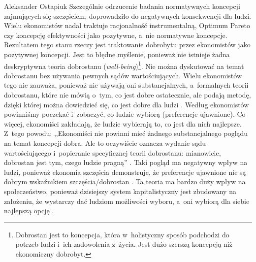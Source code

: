 \begin{artplenv}{Aleksander Ostapiuk}
Szczególnie odrzucenie badania normatywnych koncepcji zajmujących się szczęściem, doprowadziło do negatywnych
konsekwencji dla ludzi. Wielu ekonomistów nadal traktuje racjonalność instrumentalną, Optimum Pareto czy koncepcję
efektywności jako pozytywne, a~nie normatywne koncepcje. Rezultatem tego stanu rzeczy jest traktowanie dobrobytu przez
ekonomistów jako pozytywnej koncepcji. Jest to błędne myślenie, ponieważ nie istnieje żadna deskryptywna teoria
dobrostanu (\textit{well-being})\footnote{Dobrostan jest to koncepcja, która w~holistyczny sposób podchodzi do potrzeb
ludzi i~ich zadowolenia z~życia. Jest dużo szerszą koncepcją niż ekonomiczny dobrobyt. }. Nie można dyskutować na temat
dobrostanu bez używania pewnych sądów wartościujących. Wielu ekonomistów tego nie zauważa, ponieważ nie używają oni
substancjalnych, a~formalnych teorii dobrostanu, które nie mówią o~tym, co jest dobre ostatecznie, ale podają metodę,
dzięki której można dowiedzieć się, co jest dobre dla ludzi
\parencite[s.~245]{hausman_etyka_2017_ost}.
Według ekonomistów powinniśmy poczekać i~zobaczyć, co ludzie wybiorą (preferencje ujawnione). Co więcej, ekonomiści
zakładają, że ludzie wybierają to, co jest dla nich najlepsze. Z~tego powodu: ,,Ekonomiści nie powinni mieć żadnego
substancjalnego poglądu na temat koncepcji dobra. Ale to oczywiście oznacza wydanie sądu wartościującego i~popieranie
specyficznej teorii dobrostanu: mianowicie, dobrostan jest tym, czego ludzie pragną''
\parencite[s.~214]{reiss_philosophy_2013}.
Taki pogląd ma negatywny wpływ na ludzi, ponieważ ekonomia szczęścia demonstruje, że preferencje
ujawnione nie są dobrym wskaźnikiem szczęścia/dobrostan
\parencites{bruni_economics_2005,bruni_handbook_2007}{bruni_capabilities_2008}%
{kahneman_well-being:_1999}{frey_what_2002}{frey_happiness_2010,frey_economics_2018}.
Ta teoria ma bardzo duży wpływ na
społeczeństwo, ponieważ dzisiejszy system kapitalistyczny jest zbudowany na założeniu, że wystarczy dać ludziom
możliwości wyboru, a~oni wybiorą dla siebie najlepszą opcję
\parencite[zob.][]{friedman_free_1980}.


\end{artplenv}
